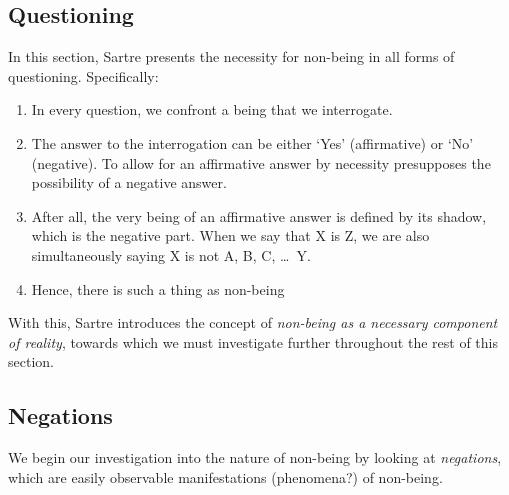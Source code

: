 \subsection{Questioning}
In this section, Sartre presents the necessity for non-being in all forms of questioning. Specifically:

\begin{enumerate}
  \item In every question, we confront a being that we interrogate.
  \item The answer to the interrogation can be either `Yes' (affirmative) or `No' (negative). To allow for an affirmative answer by necessity presupposes the possibility of a negative answer.
  \item After all, the very being of an affirmative answer is defined by its shadow, which is the negative part. When we say that X is Z, we are also simultaneously saying X is not A, B, C, \ldots\ Y. 
  \item Hence, there is such a thing as non-being
\end{enumerate}

\noindent
With this, Sartre introduces the concept of \emph{non-being as a necessary component of reality}, towards which we must investigate further throughout the rest of this section.

\subsection{Negations}
We begin our investigation into the nature of non-being by looking at \emph{negations}, which are easily observable manifestations (phenomena?) of non-being.

